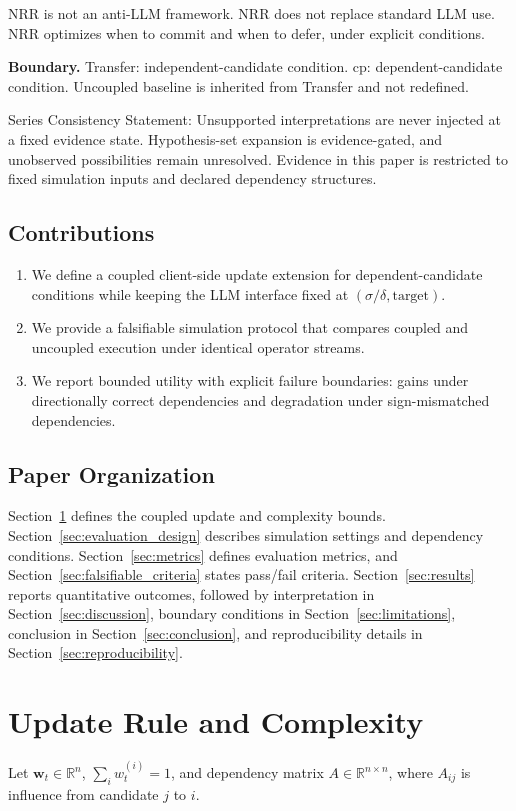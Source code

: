 \documentclass[11pt,a4paper]{article}
\begin{document}
NRR is not an anti-LLM framework.
NRR does not replace standard LLM use.
NRR optimizes when to commit and when to defer, under explicit conditions.

\textbf{Boundary.}
Transfer: independent-candidate condition.
cp: dependent-candidate condition.
Uncoupled baseline is inherited from Transfer and not redefined.

Series Consistency Statement: Unsupported interpretations are never injected at a fixed evidence state. Hypothesis-set expansion is evidence-gated, and unobserved possibilities remain unresolved. Evidence in this paper is restricted to fixed simulation inputs and declared dependency structures.

\subsection{Contributions}
\begin{enumerate}
  \item We define a coupled client-side update extension for dependent-candidate conditions while keeping the LLM interface fixed at \((\sigma/\delta,\text{target})\).
  \item We provide a falsifiable simulation protocol that compares coupled and uncoupled execution under identical operator streams.
  \item We report bounded utility with explicit failure boundaries: gains under directionally correct dependencies and degradation under sign-mismatched dependencies.
\end{enumerate}

\subsection{Paper Organization}
Section~\ref{sec:update_rule} defines the coupled update and complexity bounds. Section~\ref{sec:evaluation_design} describes simulation settings and dependency conditions. Section~\ref{sec:metrics} defines evaluation metrics, and Section~\ref{sec:falsifiable_criteria} states pass/fail criteria. Section~\ref{sec:results} reports quantitative outcomes, followed by interpretation in Section~\ref{sec:discussion}, boundary conditions in Section~\ref{sec:limitations}, conclusion in Section~\ref{sec:conclusion}, and reproducibility details in Section~\ref{sec:reproducibility}.

\section{Update Rule and Complexity}
\label{sec:update_rule}
Let \(\mathbf{w}_t\in\mathbb{R}^n\), \(\sum_i w_t^{(i)}=1\), and dependency matrix \(A\in\mathbb{R}^{n\times n}\), where \(A_{ij}\) is influence from candidate \(j\) to \(i\).
\end{document}
